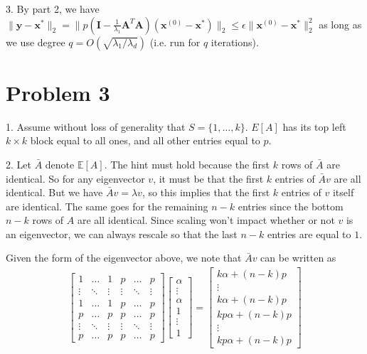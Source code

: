 \documentclass[11pt]{article}
\newcommand{\bv}[1]{\mathbf{#1}}
\newcommand{\E}{\mathbb{E}}
\begin{document}
3. By part 2, we have $\|\bv{y} - \bv{x}^*\|_2 = \|p\left(\bv{I} - \frac{1}{\lambda_1}\bv{A}^T\bv{A}\right)(\bv{x}^{(0)} - \bv{x}^*)\|_2 \leq \epsilon \|\bv{x}^{(0)} - \bv{x}^*\|_2^2$ as long as we use degree $q = O(\sqrt{\lambda_1/\lambda_d})$ (i.e. run for $q$ iterations).

\section*{Problem 3}
1. Assume without loss of generality that $S = \{1, \ldots, k\}$. $E[A]$ has its top left $k\times k$ block equal to all ones, and all other entries equal to $p$. 

2. Let $\bar{A}$ denote $\E[A]$. The hint must hold because the first $k$ rows of $\bar{A}$ are identical. So for any eigenvector $v$, it must be that the first $k$ entries of $\bar{A}v$ are  all identical. But we have $\bar{A}v = \lambda v$, so this implies that the first $k$ entries of $v$ itself are identical. The same goes for the remaining $n-k$ entries since the bottom $n-k$ rows of $A$ are all identical. Since scaling won't impact whether or not $v$ is an eigenvector, we can always rescale so that the last  $n-k$ entries are equal to $1$. 

Given the form of the eigenvector above, we note that $\bar{A}v$ can be written as
\begin{align}
	\label{bmatrix}
	\begin{bmatrix}
		1 & \ldots & 1  & p & \ldots & p   \\
		\vdots & \ddots & \vdots & \vdots & \ddots & \vdots   \\
		1 & \ldots & 1 & p & \ldots & p\\
				p & \ldots & p  & p & \ldots & p   \\
		\vdots & \ddots & \vdots & \vdots & \ddots & \vdots   \\
		p & \ldots & p & p & \ldots & p
	\end{bmatrix}
	\begin{bmatrix}
		\alpha \\ \vdots \\ \alpha \\  1 \\ \vdots \\ 1 
		\end{bmatrix} =
	\begin{bmatrix}
		k\alpha + (n-k)p \\ \vdots \\ k\alpha + (n-k)p \\  	kp\alpha + (n-k)p  \\ \vdots \\ kp\alpha + (n-k)p
		 \end{bmatrix}
\end{align}
\end{document}
